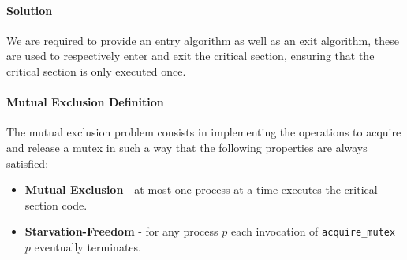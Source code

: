 \paragraph{Solution}
We are required to provide an entry algorithm as well as an exit algorithm,
these are used to respectively enter and exit the critical section,
ensuring that the critical section is only executed once.

\paragraph{Mutual Exclusion Definition}
The mutual exclusion problem consists in implementing the operations to acquire and release a mutex
in such a way that the following properties are always satisfied:

\begin{itemize}
    \item \textbf{Mutual Exclusion} - at most one process at a time executes the critical section code.
    \item \textbf{Starvation-Freedom} - for any process $p$ each invocation of \texttt{acquire\_mutex} $p$ eventually terminates.
\end{itemize}